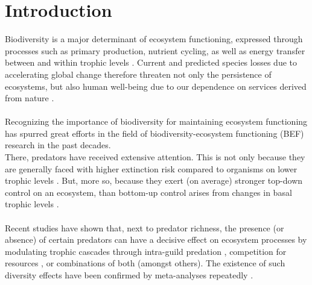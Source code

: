 \chapter{Introduction}
\label{chap:intro}
Biodiversity is a major determinant of ecosystem functioning, expressed through processes such as primary production, nutrient cycling, as well as energy transfer between and within trophic levels \citep[cf.][for review]{Tilman2014}. 
Current and predicted species losses due to accelerating global change \citep[e.g.][]{Ceballos2015, Urban2015} therefore threaten not only the persistence of ecosystems, but also human well-being due to our dependence on services derived from nature \citep{MEA2005,Cardinale2012}.
\\\\
Recognizing the importance of biodiversity for maintaining ecosystem functioning has spurred great efforts in the field of biodiversity-ecosystem functioning (BEF) research in the past decades.\\
There, predators have received extensive attention. This is not only because they are generally faced with higher extinction risk compared to organisms on lower trophic levels  \citep{Dobson2006,Ripple2014}. But, more so, because they exert (on average) stronger top-down control on an ecosystem, than bottom-up control arises from changes in basal trophic levels \citep{Borer2006}.  \\\\
Recent studies have shown that, next to predator richness, the presence (or absence) of certain predators can have a decisive effect on ecosystem processes by modulating trophic cascades through intra-guild predation \citep{Finke2005,Wallach2015}, competition for resources  \citep{OConnor2008,Rodriguez-Lozano2015}, or combinations of both (amongst others). %
The existence of such diversity effects have been confirmed by meta-analyses repeatedly  \citep{Balvanera2006, Cardinale2006, Cardinale2012,Hooper2012}.\\\\ %
